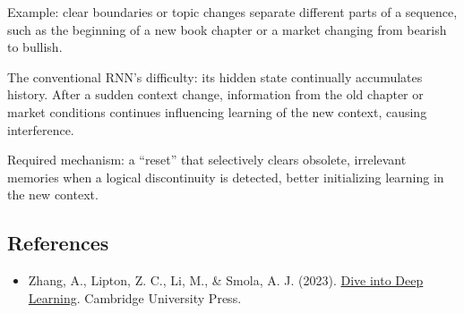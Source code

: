 Example: clear boundaries or topic changes separate different parts of a sequence, such as the beginning of a new book chapter or a market changing from bearish to bullish.

The conventional RNN's difficulty: its hidden state continually accumulates history. After a sudden context change, information from the old chapter or market conditions continues influencing learning of the new context, causing interference.

Required mechanism: a ``reset'' that selectively clears obsolete, irrelevant memories when a logical discontinuity is detected, better initializing learning in the new context.

\FloatBarrier
{}
\hypertarget{references-18}{%
\subsection{References}\label{references-18}}

\vspace{0.25em}
\begin{itemize}
\tightlist
\item
  Zhang, A., Lipton, Z. C., Li, M., \& Smola, A. J. (2023). \href{https://D2L.ai}{Dive into Deep Learning}. Cambridge University Press.
\end{itemize}

\clearpage
